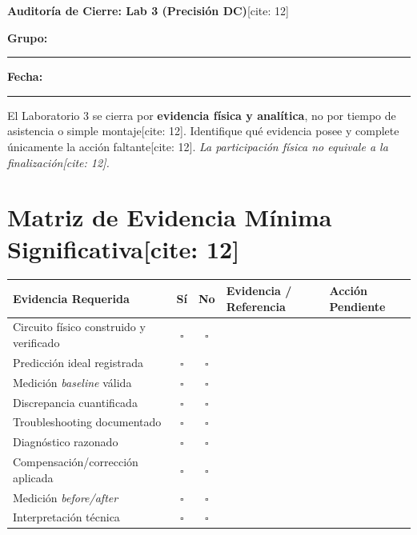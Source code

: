 \documentclass[11pt, a4paper]{article}
\begin{document}
\begin{center}
    \Large\textbf{\textcolor{ucbblue}{Auditoría de Cierre: Lab 3 (Precisión DC)}}[cite: 12]
\end{center}

\textbf{Grupo:} \rule{4cm}{0.4pt} \hfill \textbf{Fecha:} \rule{3cm}{0.4pt}

\begin{tcolorbox}[colback=red!5, colframe=red!70!black, title=\textbf{Instrucción Oficial[cite: 12]}]
    El Laboratorio 3 se cierra por \textbf{evidencia física y analítica}, no por tiempo de asistencia o simple montaje[cite: 12]. Identifique qué evidencia posee y complete únicamente la acción faltante[cite: 12]. \textit{La participación física no equivale a la finalización[cite: 12].}
\end{tcolorbox}

\section*{Matriz de Evidencia Mínima Significativa[cite: 12]}
\begin{table}[h!]
    \centering
    \footnotesize
    \renewcommand{\arraystretch}{1.5}
    \begin{tabularx}{\textwidth}{|>{\raggedright\arraybackslash}p{4cm}|c|c|X|X|}
    \hline
    \textbf{Evidencia Requerida} & \textbf{Sí} & \textbf{No} & \textbf{Evidencia / Referencia} & \textbf{Acción Pendiente} \\ \hline
    Circuito físico construido y verificado & $\square$ & $\square$ & & \\ \hline
    Predicción ideal registrada & $\square$ & $\square$ & & \\ \hline
    Medición \textit{baseline} válida & $\square$ & $\square$ & & \\ \hline
    Discrepancia cuantificada & $\square$ & $\square$ & & \\ \hline
    Troubleshooting documentado & $\square$ & $\square$ & & \\ \hline
    Diagnóstico razonado & $\square$ & $\square$ & & \\ \hline
    Compensación/corrección aplicada & $\square$ & $\square$ & & \\ \hline
    Medición \textit{before/after} & $\square$ & $\square$ & & \\ \hline
    Interpretación técnica & $\square$ & $\square$ & & \\ \hline
    \end{tabularx}
\end{table}
\end{document}
